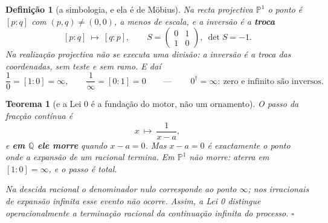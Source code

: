\documentclass[11pt,a4paper]{article}
\newtheorem{teorema}{Teorema}
\newtheorem{definicao}{Definição}
\newcommand{\dg}{^{\dagger}}
\begin{document}
\begin{definicao}[a simbologia, e ela é de Möbius]\label{def:lei0}
Na recta projectiva $\mathbb{P}^1$ o ponto é $[p:q]$ com $(p,q)\neq(0,0)$, a menos
de escala, e a inversão é a \textbf{troca}
\[
\boxed{\;[p:q]\ \longmapsto\ [q:p],
\qquad S=\begin{pmatrix}0&1\\1&0\end{pmatrix},\ \det S=-1 .\;}
\]
\emph{Na realização projectiva não se executa uma divisão}: a inversão é a troca
das coordenadas, sem teste e sem ramo. E daí
\[
\frac10=[1:0]=\infty,
\qquad
\frac1\infty=[0:1]=0
\qquad\text{---}\qquad
\boxed{\;0\dg=\infty:\ \text{zero e infinito são inversos.}\;}
\]
\end{definicao}

\begin{teorema}[e a Lei 0 é a fundação do motor, não um ornamento]\label{thm:lei0}
O passo da fracção contínua é
\[
x\ \longmapsto\ \frac{1}{x-a},
\]
e \textbf{em $\mathbb{Q}$ ele morre} quando $x-a=0$. Mas $x-a=0$ é
\emph{exactamente} o ponto onde a expansão de um racional termina. Em
$\mathbb{P}^1$ não morre: aterra em $[1:0]=\infty$, e o passo é total.

Na descida racional o denominador nulo corresponde ao ponto $\infty$; nos
irracionais de expansão infinita esse evento não ocorre. \emph{Assim, a Lei 0
distingue operacionalmente a terminação racional da continuação infinita do
processo.} $\square$
\end{teorema}
\end{document}
